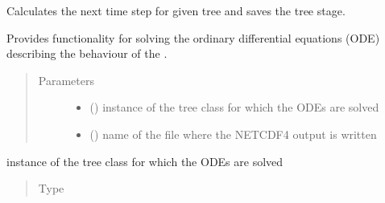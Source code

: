 \documentclass[letterpaper,10pt,english]{sphinxmanual}
\begin{document}
\begin{fulllineitems}
\label{\detokenize{index:src.model.Model}}
Calculates the next time step for given tree and saves the tree stage.

Provides functionality for solving the ordinary differential equations (ODE) describing
the behaviour of the .
\begin{quote}\begin{description}
\item[{Parameters}] \leavevmode\begin{itemize}
\item {} 
 ({\hyperref[\detokenize{index:src.tree.Tree}]{}}) \textendash{} instance of the tree class for which the ODEs are solved

\item {} 
 () \textendash{} name of the file where the NETCDF4 output is written

\end{itemize}

\end{description}\end{quote}

\begin{fulllineitems}
\label{\detokenize{index:src.model.Model.tree}}
instance of the tree class for which the ODEs are solved
\begin{quote}\begin{description}
\item[{Type}] \leavevmode
{\hyperref[\detokenize{index:src.tree.Tree}]{}}

\end{description}\end{quote}


\end{fulllineitems}
\end{fulllineitems}
\end{document}
